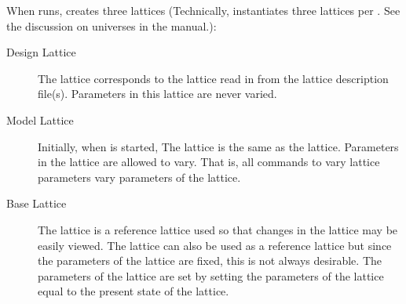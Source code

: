 \documentclass{hitec}     %
\begin{document}
{{{{When \tao runs, \tao creates three lattices
(Technically, \tao instantiates three lattices per . See the discussion on universes in the \tao manual.):
\begin{description}
\item[Design Lattice] \Newline
The  lattice corresponds to the lattice read in from the lattice
description file(s). Parameters in this lattice are never varied.
\item[Model Lattice] \Newline
Initially, when \tao is started, The  lattice is the same as the 
lattice. Parameters in the  lattice are allowed to vary. That is, all commands to vary
lattice parameters vary parameters of the  lattice.
\item[Base Lattice] \Newline
The  lattice is a reference lattice used so that changes in the  lattice may be
easily viewed. The  lattice can also be used as a reference lattice but since the
parameters of the  lattice are fixed, this is not always desirable. The parameters of the
 lattice are set by setting the parameters of the  lattice equal to the present
state of the  lattice.
\end{description}

}}}}
\end{document}
